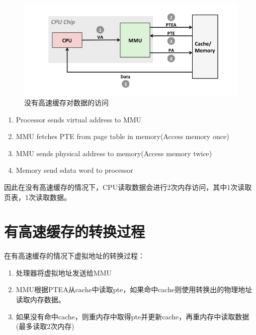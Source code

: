 \begin{figure}[htbp]
\begin{center}
\includegraphics[width=1\textwidth]{slowvava.png}
\caption{没有高速缓存对数据的访问}
\end{center}
\end{figure}

\begin{enumerate}
\item Processor sends virtual address to MMU
\item MMU fetches PTE from page table in memory(Access memory once)
\item MMU sends physical address to memory(Access memory twice)
\item Memory send sdata word to processor	
\end{enumerate}

因此在没有高速缓存的情况下，CPU读取数据会进行2次内存访问，其中1次读取页表，1次读取数据。

\section{有高速缓存的转换过程}


在有高速缓存的情况下虚拟地址的转换过程：


\begin{enumerate}
\item 处理器将虚拟地址发送给MMU
\item MMU根据PTEA从cache中读取pte，如果命中cache则使用转换出的物理地址读取内存数据。
\item 如果没有命中cache，则重内存中取得pte并更新cache，再重内存中读取数据(最多读取2次内存)
\end{enumerate}


